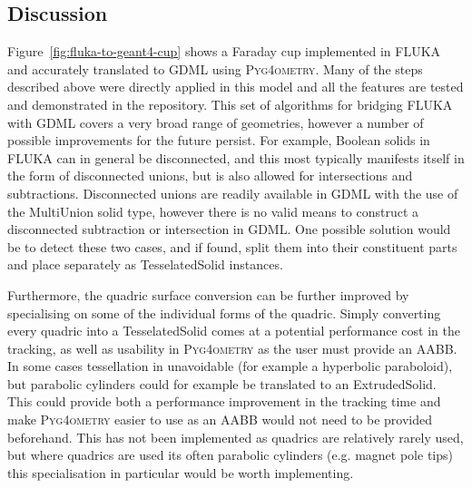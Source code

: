 \documentclass[final,5p,times,twocolumn]{elsarticle}
\newcommand{\PYGEOMETRY}{\textsc{Pyg4ometry}}
\begin{document}
\subsection{Discussion}

Figure~\ref{fig:fluka-to-geant4-cup} shows a Faraday cup implemented in
FLUKA and accurately translated to GDML using \PYGEOMETRY{}.  Many of the
steps described above were directly applied in this model and all the
features are tested and demonstrated in the repository.  This set of
algorithms for bridging FLUKA with GDML covers a very broad range of
geometries, however a number of possible improvements for the future
persist.  For example, Boolean solids in FLUKA can in general be
disconnected, and this most typically manifests itself in the form of
disconnected unions, but is also allowed for intersections and
subtractions.  Disconnected unions are readily available in GDML with the
use of the MultiUnion solid type, however there is no valid means to
construct a disconnected subtraction or intersection in GDML.  One possible
solution would be to detect these two cases, and if found, split them into
their constituent parts and place separately as TesselatedSolid instances.

Furthermore, the quadric surface conversion can be further improved by
specialising on some of the individual forms of the quadric.  Simply
converting every quadric into a TesselatedSolid comes at a potential
performance cost in the tracking, as well as usability in \PYGEOMETRY{} as the
user must provide an AABB.  In some cases tessellation in unavoidable (for
example a hyperbolic paraboloid), but parabolic cylinders could for example
be translated to an ExtrudedSolid.  This could provide both a performance
improvement in the tracking time and make \PYGEOMETRY{} easier to use as an
AABB would not need to be provided beforehand.  This has not been
implemented as quadrics are relatively rarely used, but where quadrics are
used its often parabolic cylinders (e.g. magnet pole tips) this
specialisation in particular would be worth implementing.
\end{document}
